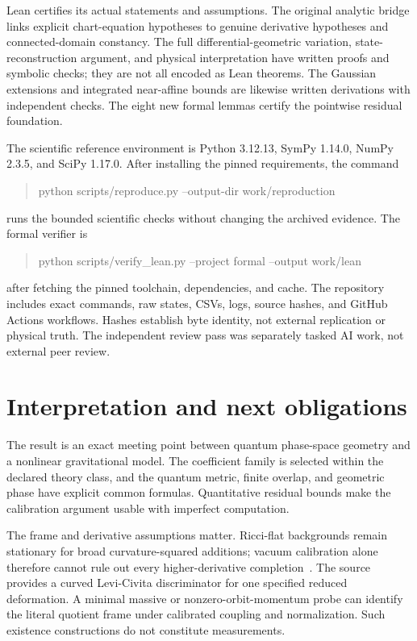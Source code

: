 \documentclass[11pt]{article}
\begin{document}
Lean certifies its actual statements and assumptions. The original analytic bridge links explicit chart-equation hypotheses to genuine derivative hypotheses and connected-domain constancy. The full differential-geometric variation, state-reconstruction argument, and physical interpretation have written proofs and symbolic checks; they are not all encoded as Lean theorems. The Gaussian extensions and integrated near-affine bounds are likewise written derivations with independent checks. The eight new formal lemmas certify the pointwise residual foundation.

The scientific reference environment is Python 3.12.13, SymPy 1.14.0, NumPy 2.3.5, and SciPy 1.17.0. After installing the pinned requirements, the command
\begin{quote}\small\ttfamily
python scripts/reproduce.py --output-dir work/reproduction
\end{quote}
runs the bounded scientific checks without changing the archived evidence. The formal verifier is
\begin{quote}\small\ttfamily
python scripts/verify\_lean.py --project formal --output work/lean
\end{quote}
after fetching the pinned toolchain, dependencies, and cache. The repository includes exact commands, raw states, CSVs, logs, source hashes, and GitHub Actions workflows. Hashes establish byte identity, not external replication or physical truth. The independent review pass was separately tasked AI work, not external peer review.

\section{Interpretation and next obligations}
The result is an exact meeting point between quantum phase-space geometry and a nonlinear gravitational model. The coefficient family is selected within the declared theory class, and the quantum metric, finite overlap, and geometric phase have explicit common formulas. Quantitative residual bounds make the calibration argument usable with imperfect computation.

The frame and derivative assumptions matter. Ricci-flat backgrounds remain stationary for broad curvature-squared additions; vacuum calibration alone therefore cannot rule out every higher-derivative completion~\cite{Pravda}. The source provides a curved Levi-Civita discriminator for one specified reduced deformation. A minimal massive or nonzero-orbit-momentum probe can identify the literal quotient frame under calibrated coupling and normalization. Such existence constructions do not constitute measurements.
\end{document}
